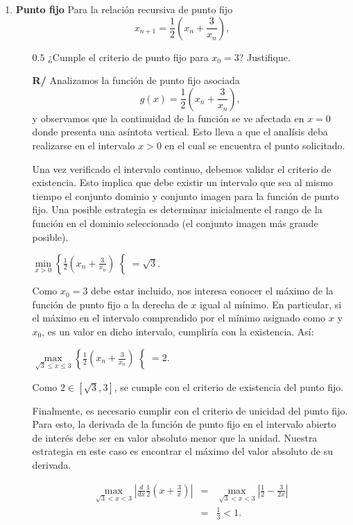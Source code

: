 \documentclass[12pt]{article}
\begin{document}
  \begin{enumerate}[leftmargin=*,widest=9]
    \item \textbf{Punto fijo} Para la relación recursiva de punto fijo \[x_{n+1} = \frac{1}{2} \left(x_n + \frac{3}{x_n} \right),\]
    \begin{itemize}
    \item[$0.5$] ¿Cumple el criterio de punto fijo para $x_0 = 3$? Justifique.

    \textbf{R/} Analizamos la función de punto fijo asociada \[g(x)= \frac{1}{2} \left(x_n + \frac{3}{x_n} \right),\] y observamos que la continuidad de la función se ve afectada en \(x=0\) donde presenta una asíntota vertical. Esto lleva a que el analísis deba realizarse en el intervalo \(x > 0\) en el cual se encuentra el punto solicitado.

    Una vez verificado el intervalo continuo, debemos validar el criterio de existencia. Esto implica que debe existir un intervalo que sea al mismo tiempo el conjunto dominio y conjunto imagen para la función de punto fijo. Una posible estrategia es determinar inicialmente el rango de la función en el dominio seleccionado (el conjunto imagen más grande posible).

    \( \min\limits_{x>0}\left\lbrace \frac{1}{2} \left(x_n + \frac{3}{x_n} \right)\right\lbrace = \sqrt{3}. \)

    Como $x_0 = 3$ debe estar incluido, nos interesa conocer el máximo de la función de punto fijo a la derecha de \(x\) igual al mínimo. En particular, si el máximo en el intervalo comprendido por el mínimo asignado como \(x\) y \(x_0\), es un valor en dicho intervalo, cumpliría con la existencia. Así:

    \( \max\limits_{\sqrt{3} \leq x \leq 3}\left\lbrace \frac{1}{2} \left(x_n + \frac{3}{x_n} \right)\right\lbrace = 2. \)

    Como \(2 \in \left[\sqrt{3}, 3\right]\), se cumple con el criterio de existencia del punto fijo.

    Finalmente, es necesario cumplir con el criterio de unicidad del punto fijo. Para esto, la derivada de la función de punto fijo en el intervalo abierto de interés debe ser en valor absoluto menor que la unidad. Nuestra estrategia en este caso es encontrar el máximo del valor absoluto de su derivada.

    \begin{eqnarray*}
    \max\limits_{\sqrt{3} < x < 3}\left\vert \frac{d}{dx} \frac{1}{2} \left(x + \frac{3}{x} \right) \right\vert & = & \max\limits_{\sqrt{3} < x < 3}\left\vert \frac{1}{2}- \frac{3}{2x} \right\vert \\
    & = & \frac{1}{3} < 1.
    \end{eqnarray*}


\end{itemize}
\end{enumerate}
\end{document}
